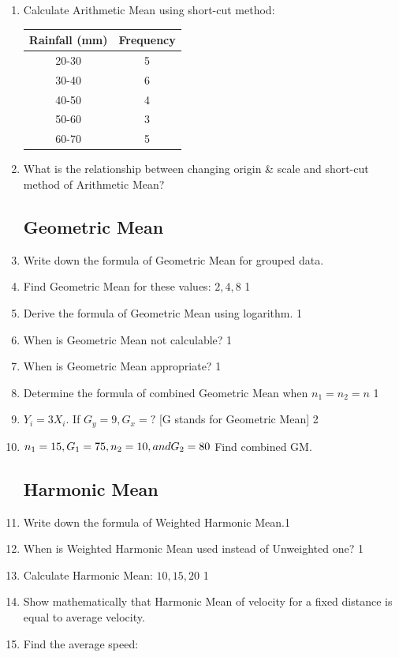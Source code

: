 \documentclass[a4paper,oneside]{book}
\begin{document}
\begin{enumerate}
    \item Calculate Arithmetic Mean using short-cut method:
    
    \begin{table}[h]
    \centering
\begin{tabular}{c|c}
\textbf{Rainfall (mm)} & \textbf{Frequency} \\ \hline
20-30                  & 5                  \\ \hline
30-40                  & 6                  \\ \hline
40-50                  & 4                  \\ \hline
50-60                  & 3                  \\
60-70                  & 5                 
\end{tabular}
\end{table}

    \item What is the relationship between changing origin \& scale and short-cut method of Arithmetic Mean?

\subsection{Geometric Mean}    
    \item Write down the formula of Geometric Mean for grouped data.
    \item Find Geometric Mean for these values: $2, 4, 8$ \hfill 1
    \item Derive the formula of Geometric Mean using logarithm. \hfill 1
    \item When is Geometric Mean not calculable? \hfill 1
    \item When is Geometric Mean appropriate? \hfill 1
    \item Determine the formula of combined Geometric Mean when $n_1=n_2=n$ \hfill 1
    \item $Y_i = 3X_i$. If $G_y = 9, G_x=?$ [G stands for Geometric Mean] \hfill 2
    \item $n_1=15, G_1=75, n_2=10, \space and \space G_2=80$ Find combined GM.

\subsection{Harmonic Mean}

    \item Write down the formula of Weighted Harmonic Mean.\hfill 1
    \item When is Weighted Harmonic Mean used instead of Unweighted one? \hfill 1
    \item Calculate Harmonic Mean: $10,15,20$ \hfill 1
    \item Show mathematically that Harmonic Mean of velocity for a fixed distance is equal to average velocity.
    \item Find the average speed:
    

\end{enumerate}
\end{document}
